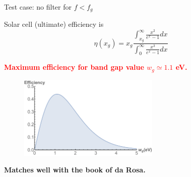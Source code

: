 \documentclass{beamer}
\begin{document}
\begin{frame}{Test case: no filter for $f < f_{g}$}

Solar cell (ultimate) efficiency is 
$$ \eta (x_{g}) = x_{g}\frac{\int_{x_{g}}^{\infty}\frac{x^2}{e^x-1}dx}{\int_{0}^{\infty}\frac{x^3}{e^x-1}dx}$$  
\vspace{0.2cm}

\begin{center}
\textcolor{red}{\textbf{Maximum efficiency for band gap value $w_{g} \simeq 1.1$ eV.}}
\end{center}

\begin{figure} [t]
\includegraphics[width=0.6\textwidth]{figures/figure3_solar_cell_efficiency_vs_bandgap.pdf}
\end{figure}

\begin{center}
{\textbf{Matches well with the book of da Rosa.}}
\end{center}

\end{frame}
\end{document}
